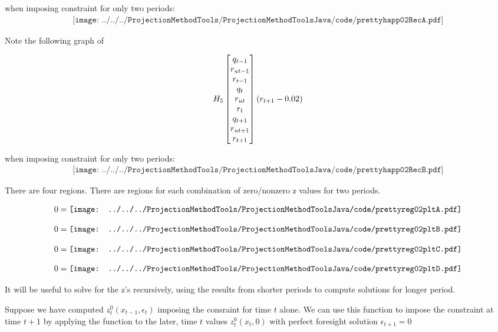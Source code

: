   when imposing constraint for only two periods:
 \begin{gather*}
 \texttt{[image: ../../../ProjectionMethodTools/ProjectionMethodToolsJava/code/prettyhapp02RecA.pdf]}
 \end{gather*}


 Note the following graph of 

 \begin{gather*}
 H_{5}\begin{bmatrix} q_{t-1}\\r_{ut-1}\\r_{t-1}\\ q_{t}\\r_{ut}\\r_{t}\\ q_{t+1}\\r_{ut+1}\\r_{t+1} \end{bmatrix}( r_{t+1}-0.02)
 \end{gather*}

  when imposing constraint for only two periods:
 \begin{gather*}
 \texttt{[image: ../../../ProjectionMethodTools/ProjectionMethodToolsJava/code/prettyhapp02RecB.pdf]}
 \end{gather*}




There are four regions.  There are regions for each combination of zero/nonzero z values for two periods.



\begin{gather*}
  0=\vcenter{\hbox{\texttt{[image: ../../../ProjectionMethodTools/ProjectionMethodToolsJava/code/prettyreg02pltA.pdf]}}}
\end{gather*}


\begin{gather*}
  0=\vcenter{\hbox{\texttt{[image: ../../../ProjectionMethodTools/ProjectionMethodToolsJava/code/prettyreg02pltB.pdf]}}}
\end{gather*}


\begin{gather*}
  0=\vcenter{\hbox{\texttt{[image: ../../../ProjectionMethodTools/ProjectionMethodToolsJava/code/prettyreg02pltC.pdf]}}}
\end{gather*}


\begin{gather*}
  0=\vcenter{\hbox{\texttt{[image: ../../../ProjectionMethodTools/ProjectionMethodToolsJava/code/prettyreg02pltD.pdf]}}}
\end{gather*}




It will be useful to solve for the z's recursively, using the results from shorter periods to compute solutions for longer period.

Suppose we have computed $z^0_t(x_{t-1},\epsilon_t)$ imposing the consraint for time $t$ alone.  We can use this function to impose the constraint at time $t+1$ by applying the function to the later, time $t$ values   $z^0_t(x_{t},0)$ with perfect foresight solution $\epsilon_{t+1}=0$


